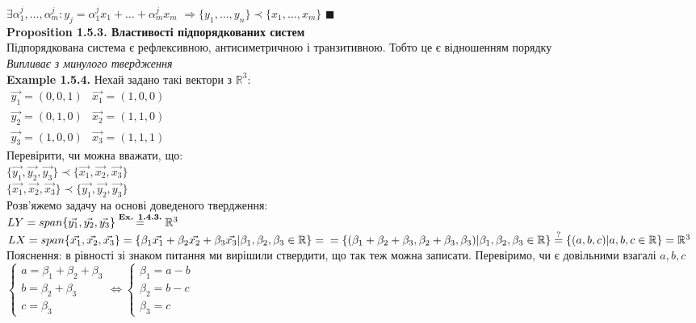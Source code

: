 \documentclass[a4paper, 14pt]{extarticle}
\def\ex#1{\textbf{Example {#1}}}
\def\prp#1{\textbf{Proposition {#1}}}
\def\bigline{\vspace{5mm}\\}
\def\qed{$\blacksquare$}
\begin{document}
	$\exists \alpha^j_1, \dots, \alpha^j_m: y_j = \alpha^j_1 x_1 + \dots + \alpha^j_m x_m$
	$\Rightarrow \{y_1, \dots, y_n \} \prec \{x_1, \dots, x_m \}$ \qed
	\bigline
	\prp{1.5.3. Властивості підпорядкованих систем}\\
	Підпорядкована система є рефлексивною, антисиметричною і транзитивною. Тобто це є відношенням порядку\\
	\textit{Випливає з минулого твердження}
	\bigline
	\ex{1.5.4.} Нехай задано такі вектори з $\mathbb{R}^3$:\\
	$\begin{matrix}
	\vec{y_1} = (0,0,1) & \vec{x_1} = (1,0,0) \\
	\vec{y_2} = (0,1,0) & \vec{x_2} = (1,1,0) \\
	\vec{y_3} = (1,0,0) & \vec{x_3} = (1,1,1)
	\end{matrix}
	$\\
	Перевірити, чи можна вважати, що:\\
	$\{\vec{y_1}, \vec{y_2}, \vec{y_3}\} \prec \{\vec{x_1}, \vec{x_2}, \vec{x_3}\}$\\
	$\{\vec{x_1}, \vec{x_2}, \vec{x_3}\} \prec \{\vec{y_1}, \vec{y_2}, \vec{y_3}\}$\\
	Розв'яжемо задачу на основі доведеного твердження:\\
	$LY =span\{\vec{y_1},\vec{y_2},\vec{y_3}\} \overset{\textrm{\textbf{Ex. 1.4.3.}}}{=} \mathbb{R}^3$\\
	$LX = span\{\vec{x_1},\vec{x_2},\vec{x_3}\} = \{\beta_1 \vec{x_1} + \beta_2 \vec{x_2} +\beta_3 \vec{x_3} | \beta_1, \beta_2, \beta_3 \in \mathbb{R} \} = \\ = \{(\beta_1+\beta_2+\beta_3, \beta_2+\beta_3, \beta_3) | \beta_1, \beta_2, \beta_3 \in \mathbb{R} \} \overset{\textrm{?}}{=} \{(a,b,c) | a,b,c \in \mathbb{R} \} = \mathbb{R}^3$\\
	Пояснення: в рівності зі знаком питання ми вирішили ствердити, що так теж можна записати. Перевіримо, чи є довільними взагалі $a,b,c$\\
	$\begin{cases}
	a = \beta_1 + \beta_2 + \beta_3\\
	b = \beta_2 + \beta_3\\
	c = \beta_3
	\end{cases} \iff
	\begin{cases}
	\beta_1 = a -b\\
	\beta_2 = b - c\\
	\beta_3 = c
	\end{cases}
	$\\
\end{document}
